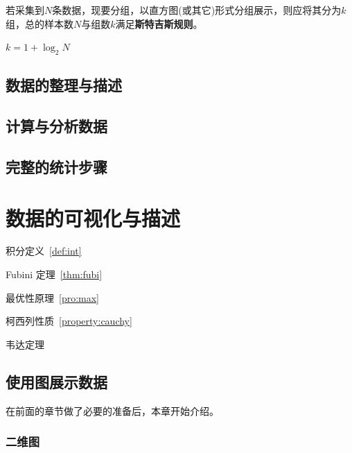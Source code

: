 \documentclass[lang=cn,10pt]{elegantbook}
\begin{document}
若采集到$N$条数据，现要分组，以直方图(或其它)形式分组展示，则应将其分为$k$组，总的样本数$N$与组数$k$满足\textbf{斯特吉斯规则}。

\begin{theorem}  
    \begin{center}
      $k = 1 + \log_2 N$
    \end{center}   

\end{theorem}


\section{数据的整理与描述}



\section{计算与分析数据}



\section{完整的统计步骤}









\chapter{数据的可视化与描述}

\begin{introduction}
  \item 积分定义~\ref{def:int}
  \item Fubini 定理~\ref{thm:fubi}
  \item 最优性原理~\ref{pro:max}
  \item 柯西列性质~\ref{property:cauchy}
  \item 韦达定理
\end{introduction}

\section{使用图展示数据}
在前面的章节做了必要的准备后，本章开始介绍。

\subsection{二维图}
\end{document}
